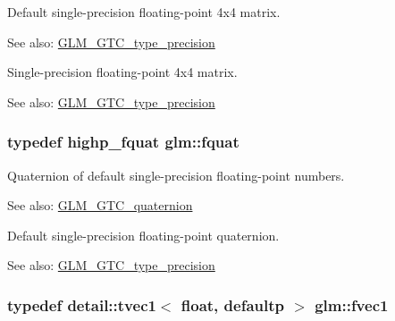 Default single-precision floating-point 4x4 matrix. \begin{Desc}
\item[See also:]\hyperlink{group__gtc__type__precision}{GLM\_\-GTC\_\-type\_\-precision}\end{Desc}
Single-precision floating-point 4x4 matrix. \begin{Desc}
\item[See also:]\hyperlink{group__gtc__type__precision}{GLM\_\-GTC\_\-type\_\-precision} \end{Desc}
\hypertarget{group__gtc__type__precision_ga95d73f08018f3864c6ae08dbf1c59f2}{
\subsubsection[fquat]{\setlength{\rightskip}{0pt plus 5cm}typedef highp\_\-fquat {\bf glm::fquat}}}
\label{group__gtc__type__precision_ga95d73f08018f3864c6ae08dbf1c59f2}


Quaternion of default single-precision floating-point numbers.

\begin{Desc}
\item[See also:]\hyperlink{group__gtc__quaternion}{GLM\_\-GTC\_\-quaternion}\end{Desc}
Default single-precision floating-point quaternion. \begin{Desc}
\item[See also:]\hyperlink{group__gtc__type__precision}{GLM\_\-GTC\_\-type\_\-precision} \end{Desc}
\hypertarget{group__gtc__type__precision_gb927d62f22fa57461367011950cec650}{
\subsubsection[fvec1]{\setlength{\rightskip}{0pt plus 5cm}typedef detail::tvec1$<$ float, defaultp $>$ {\bf glm::fvec1}}}
\label{group__gtc__type__precision_gb927d62f22fa57461367011950cec650}


